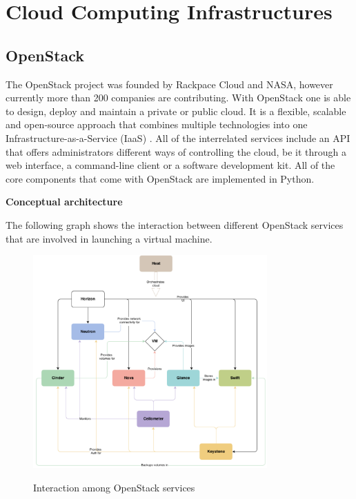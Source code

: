 \section{Cloud Computing Infrastructures}


\subsection{OpenStack}

The OpenStack project was founded by Rackpace Cloud and NASA, however currently more than 200 companies are contributing.
With OpenStack one is able to design, deploy and maintain a private or public cloud. It is a flexible, scalable and open-source approach that combines multiple technologies into one Infrastructure-as-a-Service (IaaS) \cite{openstack-ops}. All of the interrelated services include an API that offers administrators different ways of controlling the cloud, be it through a web interface, a command-line client or a software development kit. All of the core components that come with OpenStack are implemented in Python.


\textbf{Conceptual architecture}


The following graph shows the interaction between different OpenStack services that are involved in launching a virtual machine.

\begin{figure}[H]
\centering
\includegraphics[width=0.8\textwidth]{images/fundamentals/openstack_conceptual_arch.png}
\caption{Interaction among OpenStack services}\cite{openstack-installjuno}
\end{figure}


